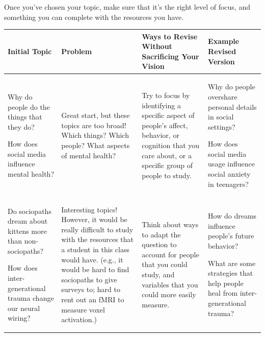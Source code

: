 \documentclass[
  letterpaper,
  DIV=11,
  numbers=noendperiod,
  oneside]{scrreprt}
\begin{document}
Once you've chosen your topic, make sure that it's the right level of
focus, and something you can complete with the resources you have.

\begin{longtable}[]{@{}
  >{\raggedright\arraybackslash}p{}
  >{\raggedright\arraybackslash}p{}
  >{\raggedright\arraybackslash}p{}
  >{\raggedright\arraybackslash}p{}@{}}
\toprule\noalign{}
\begin{minipage}[b]{\linewidth}\raggedright
Initial Topic
\end{minipage} & \begin{minipage}[b]{\linewidth}\raggedright
Problem
\end{minipage} & \begin{minipage}[b]{\linewidth}\raggedright
Ways to Revise Without Sacrificing Your Vision
\end{minipage} & \begin{minipage}[b]{\linewidth}\raggedright
Example Revised Version
\end{minipage} \\
\midrule\noalign{}
\endhead
\bottomrule\noalign{}
\endlastfoot
Why do people do the things that they do?

How does social media influence mental health? & Great start, but these
topics are too broad! Which things? Which people? What aspects of mental
health? & Try to focus by identifying a specific aspect of people's
affect, behavior, or cognition that you care about, or a specific group
of people to study. & Why do people overshare personal details in social
settings?

How does social media usage influence social anxiety in teenagers? \\
Do sociopaths dream about kittens more than non-sociopaths?

How does inter-generational trauma change our neural wiring? &
Interesting topics! However, it would be really difficult to study with
the resources that a student in this class would have. (e.g., it would
be hard to find sociopaths to give surveys to; hard to rent out an fMRI
to measure voxel activation.) & Think about ways to adapt the question
to account for people that you could study, and variables that you could
more easily measure. & How do dreams influence people's future behavior?

What are some strategies that help people heal from inter-generational
trauma? \\
\end{longtable}
\end{document}
